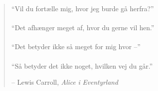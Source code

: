 \newpage \vspace*{4cm}
\thispagestyle{empty}
\begin{quotation}
\begin{center}
  \large
  \enquote{Vil du fortælle mig, hvor jeg burde gå herfra?} \\~\\
  \enquote{Det afhænger meget af, hvor du gerne vil hen.} \\~\\
  \enquote{Det betyder ikke så meget for mig hvor --} \\~\\
  \enquote{Så betyder det ikke noget, hvilken vej du går.}
\end{center}
\begin{flushright} -- Lewis Carroll, \textit{Alice i Eventyrland}\end{flushright}
\end{quotation}